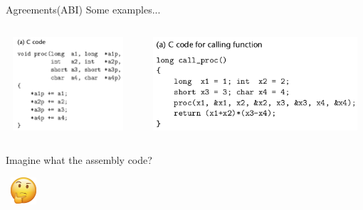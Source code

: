 \documentclass[UKenglish]{beamer}
\begin{document}
\begin{frame}{Agreements(ABI)}
  Some examples...
  
\begin{center}
  \begin{columns}[onlytextwidth]
    \begin{column}{0.45\textwidth}
          \begin{minipage}[c][0.56\textheight][c]{\linewidth} 
          \includegraphics[width = 1\textwidth, height=3.5cm]{proc_c.png}
          \end{minipage}
        \end{column}

        \begin{column}{0.45\textwidth}
          \begin{minipage}[c][0.56\textheight][c]{\linewidth} 
          \includegraphics[width = 1\textwidth, height=3.5cm]{caller_c.png}
          \end{minipage}
    \end{column}
  \end{columns}

  \Large Imagine what the assembly code?

  \begin{center}
    \includegraphics[width = 0.1\textwidth, height=1cm]{think.png}
  \end{center}
\end{center}

\end{frame}
\end{document}
